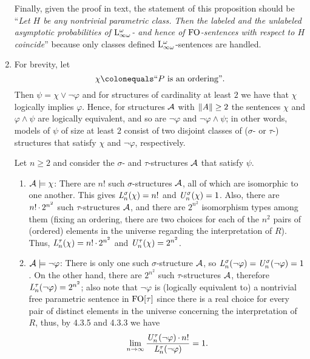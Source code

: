 \begin{enumerate}[1.]
Finally, given the proof in text, the statement of this proposition should be ``\emph{Let $H$ be any nontrivial parametric class. Then the labeled and the unlabeled asymptotic probabilities of $\inflog[\omega]$- and hence of $\folog$-sentences with respect to $H$ coincide}'' because only classes defined $\inflog[\omega]$-sentences are handled.
%
\item {} For brevity, let
\[
\chi \defas \text{``\mathmode{P} is an ordering''}.
\]
Then $\psi = \chi \lor \neg\varphi$ and for structures of cardinality at least $2$ we have that $\chi$ logically implies $\varphi$. Hence, for structures $\mathcal{A}$ with $\|A\| \geq 2$ the sentences $\chi$ and $\varphi \land \psi$ are logically equivalent, and so are $\neg\varphi$ and $\neg\varphi \land \psi$; in other words, models of $\psi$ of size at least $2$ consist of two disjoint classes of ($\sigma$- or $\tau$-) structures that satisfy $\chi$ and $\neg\varphi$, respectively.

Let $n \geq 2$ and consider the $\sigma$- and $\tau$-structures $\mathcal{A}$ that satisfy $\psi$.
\begin{enumerate}[(1)]
\item $\mathcal{A} \models \chi$: There are $n!$ such $\sigma$-structures $\mathcal{A}$, all of which are isomorphic to one another. This gives $\mathit{L}_{n}^\sigma(\chi) = n!$ and $\mathit{U}_{n}^\sigma(\chi) = 1$. Also, there are $n! \mathop{\cdot} 2^{n^2}$ such $\tau$-structures $\mathcal{A}$, and there are $2^{n^2}$ isomorphism types among them (fixing an ordering, there are two choices for each of the $n^2$ pairs of (ordered) elements in the universe regarding the interpretation of $R$). Thus, $\mathit{L}_{n}^\tau(\chi) = n! \mathop{\cdot} 2^{n^2}$ and $\mathit{U}_{n}^\tau(\chi) = 2^{n^2}$.
\item $\mathcal{A} \models \neg\varphi$: There is only one such $\sigma$-structure $\mathcal{A}$, so $\mathit{L}_{n}^\sigma(\neg\varphi) = \mathit{U}_{n}^\sigma(\neg\varphi) = 1$. On the other hand, there are $2^{n^2}$ such $\tau$-structures $\mathcal{A}$, therefore $\mathit{L}_{n}^\tau(\neg\varphi) = 2^{n^2}$; also note that $\neg\varphi$ is (logically equivalent to) a nontrivial free parametric sentence in $\folog\of{\tau}$ since there is a real choice for every pair of distinct elements in the universe concerning the interpretation of $R$, thus, by 4.3.5 and 4.3.3 we have
\[
\lim_{n \to \infty} \frac{\mathit{U}_{n}^\tau(\neg\varphi) \mathop{\cdot} n!}{\mathit{L}_{n}^\tau(\neg\varphi)} = 1.
\]


\end{enumerate}
\end{enumerate}

